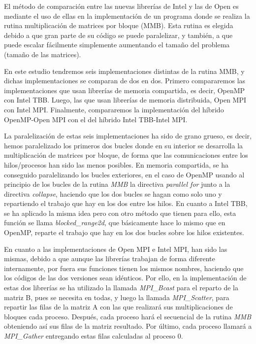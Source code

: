 \documentclass[a4paper,12pt]{article}
\begin{document}
El método de comparación entre las nuevas librerías de Intel y las de Open es mediante el uso de ellas en la implementación de un programa donde se realiza la rutina multiplicación de matrices por bloque (MMB). Esta rutina es elegida debido a que gran parte de su código se puede paralelizar, y también, a que puede escalar fácilmente simplemente aumentando el tamaño del problema (tamaño de las matrices).

En este estudio tendremos seis implementaciones distintas de la rutina MMB, y dichas implementaciones se comparan de dos en dos. Primero compararemos las implementaciones que usan librerías de memoria compartida, es decir, OpenMP con Intel TBB. Luego, las que usan librerías de memoria distribuida, Open MPI con Intel MPI. Finalmente, compararemos la implementación del híbrido OpenMP-Open MPI con el del híbrido Intel TBB-Intel MPI.

La paralelización de estas seis implementaciones ha sido de grano grueso, es decir, hemos paralelizado los primeros dos bucles donde en su interior se desarrolla la multiplicación de matrices por bloque, de forma que las comunicaciones entre los hilos/procesos han sido las menos posibles. En memoria compartida, se ha conseguido paralelizando los bucles exteriores, en el caso de OpenMP usando al principio de los bucles de la rutina {\it MMB} la directiva {\it parallel for} junto a la directiva {\it collapse}, haciendo que los dos bucles se hagan como solo uno y repartiendo el trabajo que hay en los dos entre los hilos. En cuanto a Intel TBB, se ha aplicado la misma idea pero con otro método que tienen para ello, esta función se llama {\it blocked\_range2d}, que básicamente hace lo mismo que en OpenMP, reparte el trabajo que hay en los dos bucles sobre los hilos existentes.

En cuanto a las implementaciones de Open MPI e Intel MPI, han sido las mismas, debido a que aunque las librerías trabajan de forma diferente internamente, por fuera sus funciones tienen los mismos nombres, haciendo que los códigos de las dos versiones sean idénticos. Por ello, en la implementación de estas dos librerías se ha utilizado la llamada {\it MPI\_Bcast} para el reparto de la matriz B, pues se necesita en todas, y luego la llamada {\it MPI\_Scatter}, para repartir las filas de la matriz A con las que realizará sus multiplicaciones de bloques cada proceso. Después, cada proceso hará el secuencial de la rutina {\it MMB} obteniendo así sus filas de la matriz resultado. Por último, cada proceso llamará a {\it MPI\_Gather} entregando estas filas calculadas al proceso 0.
\end{document}
